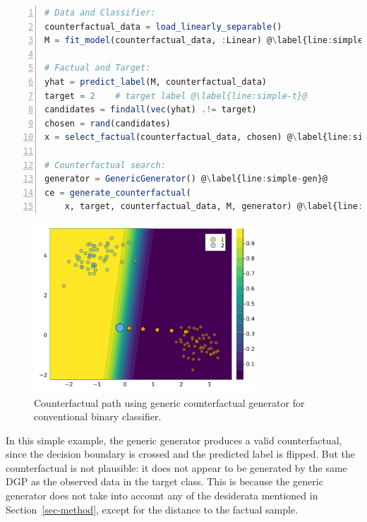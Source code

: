 \documentclass[
  letterpaper,
  DIV=11,
  numbers=noendperiod]{scrartcl}
\begin{document}
\begin{lstlisting}[language=Julia, escapechar=@, numbers=left, label={lst:simple}, caption={Standard workflow for generating counterfactuals.}] 
# Data and Classifier:
counterfactual_data = load_linearly_separable()
M = fit_model(counterfactual_data, :Linear) @\label{line:simple-class}@

# Factual and Target:
yhat = predict_label(M, counterfactual_data)
target = 2    # target label @\label{line:simple-t}@
candidates = findall(vec(yhat) .!= target)
chosen = rand(candidates)
x = select_factual(counterfactual_data, chosen) @\label{line:simple-x}@

# Counterfactual search:
generator = GenericGenerator() @\label{line:simple-gen}@
ce = generate_counterfactual(
    x, target, counterfactual_data, M, generator) @\label{line:simple-search}@
\end{lstlisting}

\begin{figure}

{\centering \includegraphics[width=3.33333in,height=2.5in]{www/ce_binary.png}

}

\caption{\label{fig-binary}Counterfactual path using generic
counterfactual generator for conventional binary classifier.}

\end{figure}

In this simple example, the generic generator produces a valid
counterfactual, since the decision boundary is crossed and the predicted
label is flipped. But the counterfactual is not plausible: it does not
appear to be generated by the same DGP as the observed data in the
target class. This is because the generic generator does not take into
account any of the desiderata mentioned in Section~\ref{sec-method},
except for the distance to the factual sample.
\end{document}
